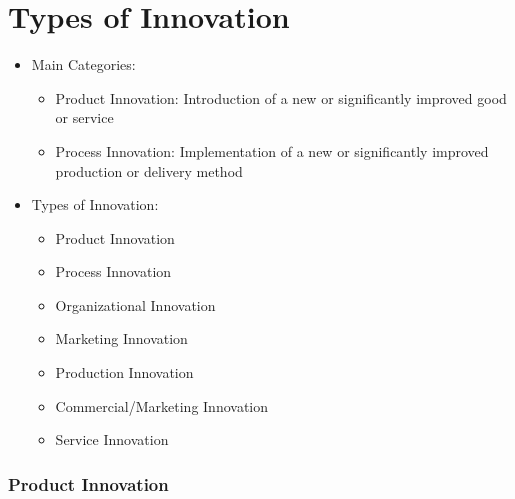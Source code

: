 \documentclass[openany,12pt,a4paper]{book}
\begin{document}
\section{Types of Innovation}
\begin{itemize}
    \item Main Categories:
    \begin{itemize}
        \item Product Innovation: Introduction of a new or significantly improved good or service
        \item Process Innovation: Implementation of a new or significantly improved production or delivery method
    \end{itemize}
    \item Types of Innovation:
    \begin{itemize}
        \item Product Innovation
        \item Process Innovation
        \item Organizational Innovation
        \item Marketing Innovation
        \item Production Innovation
        \item Commercial/Marketing Innovation
        \item Service Innovation
    \end{itemize}
\end{itemize}

\subsubsection{Product Innovation}
\end{document}
